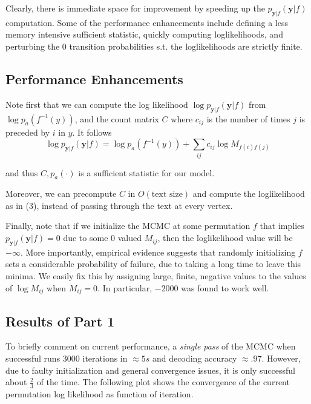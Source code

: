 \documentclass[aps,prd,final,twocolumn,letterpaper]{revtex4}
\begin{document}
Clearly, there is immediate space for improvement by speeding up the $p_{\mathbf{y}|f}(\mathbf{y}|f)$ computation. Some of the performance enhancements include defining a less memory intensive sufficient statistic, quickly computing loglikelihoods, and perturbing the 0 transition probabilities s.t. the loglikelihoods are strictly finite.

\subsection{Performance Enhancements}
Note first that we can compute the log likelihood $\log p_{\mathbf{y}|f}(\mathbf{y}|f)$ from $\log p_a(f^{-1}(y))$, and the count matrix $C$ where $c_{ij}$ is the number of times $j$ is preceded by $i$ in $y$. It follows 
\begin{equation}
\log p_{\mathbf{y}|f}(\mathbf{y}|f) = \log p_a(f^{-1}(y)) + \sum_{ij} c_{ij}\log M_{f(i)f(j)}
\end{equation}

\noindent and thus $C,p_a(\cdot)$ is a sufficient statistic for our model. 

Moreover, we can precompute $C$ in $O(\text{text size})$ and compute the loglikelihood as in (3), instead of passing through the text at every vertex. 

Finally, note that if we initialize the MCMC at some permutation $f$ that implies $p_{\mathbf{y}|f}(\mathbf{y}|f) = 0$ due to some 0 valued $M_{ij}$, then the loglikelihood value will be $-\infty$. More importantly, empirical evidence suggests that randomly initializing $f$ sets a considerable probability of failure, due to taking a long time to leave this minima. We easily fix this by assigning large, finite, negative values to the values of $\log M_{ij}$ when $M_{ij} = 0$. In particular, $-2000$ was found to work well.

\subsection{Results of Part 1}
To briefly comment on current performance, a \textit{single pass }of the MCMC when successful runs $3000$ iterations in $\approx 5s$ and decoding accuracy $\approx .97$. However, due to faulty initialization and general convergence issues, it is only successful about $\frac{2}{3}$ of the time. The following plot shows the convergence of the current permutation log likelihood as function of iteration.
\end{document}
